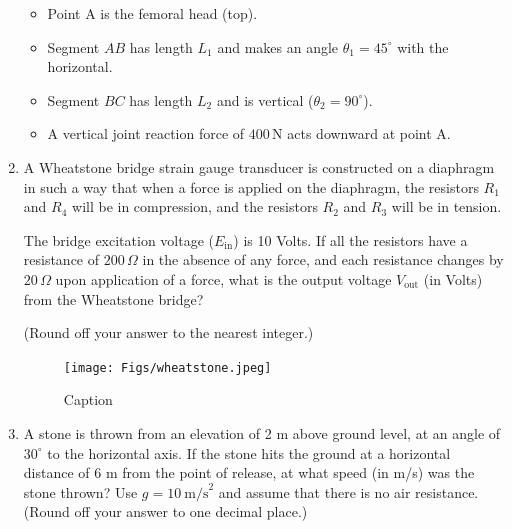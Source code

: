\documentclass[journal]{IEEEtran}
\begin{document}
\begin{enumerate}
\begin{itemize}
  \item Point A is the femoral head (top).
  \item Segment \( AB \) has length \( L_1 \) and makes an angle \( \theta_1 = 45^\circ \) with the horizontal.
  \item Segment \( BC \) has length \( L_2 \) and is vertical (\( \theta_2 = 90^\circ \)).
  \item A vertical joint reaction force of \( 400 \, \text{N} \) acts downward at point A.
\end{itemize}
\hfill{}

\item 
A Wheatstone bridge strain gauge transducer is constructed on a diaphragm in such a way that when a force is applied on the diaphragm, the resistors \( R_1 \) and \( R_4 \) will be in compression, and the resistors \( R_2 \) and \( R_3 \) will be in tension.

\vspace{1em}
The bridge excitation voltage (\( E_{\text{in}} \)) is 10 Volts. If all the resistors have a resistance of \( 200 \, \Omega \) in the absence of any force, and each resistance changes by \( 20 \, \Omega \) upon application of a force, what is the output voltage \( V_{\text{out}} \) (in Volts) from the Wheatstone bridge? 

(Round off your answer to the nearest integer.)
\begin{figure}[H]
    \centering
    \texttt{[image: Figs/wheatstone.jpeg]} 
    \caption{Caption}
    \label{fig:placeholder}
\end{figure}
\hfill{}

\item 
A stone is thrown from an elevation of 2 m above ground level, at an angle of \(30^\circ\) to the horizontal axis. If the stone hits the ground at a horizontal distance of 6 m from the point of release, at what speed (in m/s) was the stone thrown? Use \(g = 10~\text{m/s}^2\) and assume that there is no air resistance. (Round off your answer to one decimal place.)


\hfill{}
\end{enumerate}
\end{document}
